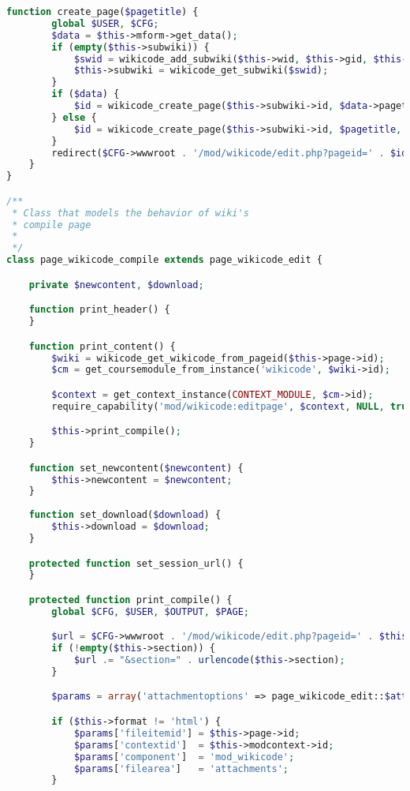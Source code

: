 \begin{lstlisting}[language=PHP]
    function create_page($pagetitle) {
        global $USER, $CFG;
        $data = $this->mform->get_data();
        if (empty($this->subwiki)) {
            $swid = wikicode_add_subwiki($this->wid, $this->gid, $this->uid);
            $this->subwiki = wikicode_get_subwiki($swid);
        }
        if ($data) {
            $id = wikicode_create_page($this->subwiki->id, $data->pagetitle, $data->pageformat, $USER->id);
        } else {
            $id = wikicode_create_page($this->subwiki->id, $pagetitle, $PAGE->activityrecord->defaultformat, $USER->id);
        }
        redirect($CFG->wwwroot . '/mod/wikicode/edit.php?pageid=' . $id);
    }
}

/**
 * Class that models the behavior of wiki's
 * compile page
 *
 */
class page_wikicode_compile extends page_wikicode_edit {

    private $newcontent, $download;

    function print_header() {
    }

    function print_content() {
        $wiki = wikicode_get_wikicode_from_pageid($this->page->id);
    	$cm = get_coursemodule_from_instance('wikicode', $wiki->id);

        $context = get_context_instance(CONTEXT_MODULE, $cm->id);
        require_capability('mod/wikicode:editpage', $context, NULL, true, 'noeditpermission', 'wikicode');

        $this->print_compile();
    }

    function set_newcontent($newcontent) {
        $this->newcontent = $newcontent;
    }
	
	function set_download($download) {
		$this->download = $download;
	}

    protected function set_session_url() {
    }

    protected function print_compile() {
        global $CFG, $USER, $OUTPUT, $PAGE;

        $url = $CFG->wwwroot . '/mod/wikicode/edit.php?pageid=' . $this->page->id;
        if (!empty($this->section)) {
            $url .= "&section=" . urlencode($this->section);
        }

        $params = array('attachmentoptions' => page_wikicode_edit::$attachmentoptions, 'format' => $this->format, 'version' => $this->versionnumber);

        if ($this->format != 'html') {
            $params['fileitemid'] = $this->page->id;
            $params['contextid']  = $this->modcontext->id;
            $params['component']  = 'mod_wikicode';
            $params['filearea']   = 'attachments';
        }


\end{lstlisting}
